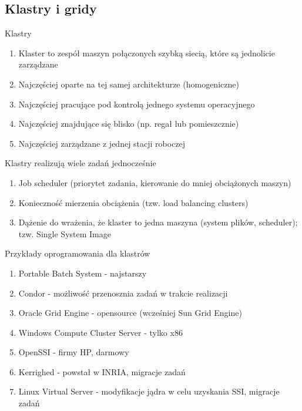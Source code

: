 \documentclass{beamer}
\begin{document}
\subsection{Klastry i gridy}

\begin{frame}{Klastry}
  \begin{enumerate}
  \item Klaster to zespół maszyn połączonych szybką siecią, które są jednolicie zarządzane
  \item Najczęściej oparte na tej samej architekturze (homogeniczne)
  \item Najczęściej pracujące pod kontrolą jednego systemu operacyjnego
  \item Najczęściej znajdujące się blisko (np. regał lub pomieszcznie)
  \item Najczęściej zarządzane z jednej stacji roboczej
  \end{enumerate}
\end{frame}

\begin{frame}{Klastry realizują wiele zadań jednocześnie}
  \begin{enumerate}
  \item Job scheduler (priorytet zadania, kierowanie do mniej obciążonych maszyn)
  \item Konieczność mierzenia obciążenia (tzw. load balancing clusters)
  \item Dążenie do wrażenia, że klaster to jedna maszyna (system plików, scheduler); tzw. Single System Image
  \end{enumerate}
\end{frame}

\begin{frame}{Przykłady oprogramowania dla klastrów}
  \begin{enumerate}
  \item Portable Batch System - najstarszy
  \item Condor - możliwość przenosznia zadań w trakcie realizacji
  \item Oracle Grid Engine - opensource (wcześniej Sun Grid Engine)
  \item Windows Compute Cluster Server - tylko x86
  \item OpenSSI - firmy HP, darmowy
  \item Kerrighed - powstał w INRIA, migracje zadań
  \item Linux Virtual Server - modyfikacje jądra w celu uzyskania SSI, migracje zadań
  \end{enumerate}
\end{frame}
\end{document}
